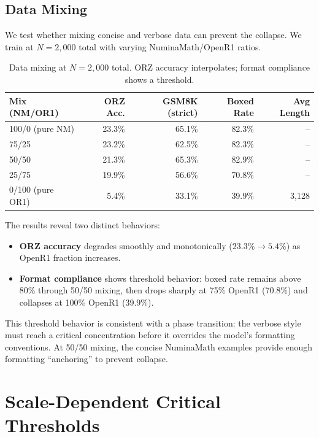 \documentclass{article}
\begin{document}
\subsection{Data Mixing}

We test whether mixing concise and verbose data can prevent the collapse. We train at $N{=}2{,}000$ total with varying NuminaMath/OpenR1 ratios.

\begin{table}[h]
\centering
\caption{Data mixing at $N{=}2{,}000$ total. ORZ accuracy interpolates; format compliance shows a threshold.}
\label{tab:mixing}
\small
\begin{tabular}{@{}lrrrr@{}}
\toprule
Mix (NM/OR1) & ORZ Acc. & GSM8K (strict) & Boxed Rate & Avg Length \\
\midrule
100/0 (pure NM) & 23.3\% & 65.1\% & 82.3\% & -- \\
75/25 & 23.2\% & 62.5\% & 82.3\% & -- \\
50/50 & 21.3\% & 65.3\% & 82.9\% & -- \\
25/75 & 19.9\% & 56.6\% & 70.8\% & -- \\
0/100 (pure OR1) & 5.4\% & 33.1\% & 39.9\% & 3,128 \\
\bottomrule
\end{tabular}
\end{table}

The results reveal two distinct behaviors:
\begin{itemize}
    \item \textbf{ORZ accuracy} degrades smoothly and monotonically ($23.3\% \to 5.4\%$) as OpenR1 fraction increases.
    \item \textbf{Format compliance} shows threshold behavior: boxed rate remains above 80\% through 50/50 mixing, then drops sharply at 75\% OpenR1 (70.8\%) and collapses at 100\% OpenR1 (39.9\%).
\end{itemize}

This threshold behavior is consistent with a phase transition: the verbose style must reach a critical concentration before it overrides the model's formatting conventions. At 50/50 mixing, the concise NuminaMath examples provide enough formatting ``anchoring'' to prevent collapse.

\section{Scale-Dependent Critical Thresholds}
\label{sec:scale}
\end{document}
